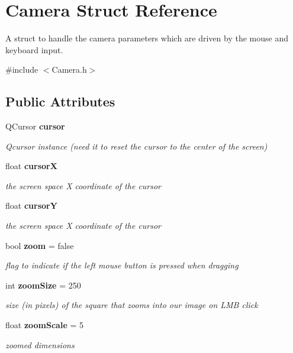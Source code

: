 \section{Camera Struct Reference}
\label{struct_camera}


A struct to handle the camera parameters which are driven by the mouse and keyboard input.  




{\ttfamily \#include $<$Camera.\+h$>$}

\subsection*{Public Attributes}
\begin{DoxyCompactItemize}
\item 
Q\+Cursor \textbf{ cursor}
\begin{DoxyCompactList}\small\item\em Qcursor instance (need it to reset the cursor to the center of the screen) \end{DoxyCompactList}\item 
float \textbf{ cursorX}
\begin{DoxyCompactList}\small\item\em the screen space X coordinate of the cursor \end{DoxyCompactList}\item 
float \textbf{ cursorY}
\begin{DoxyCompactList}\small\item\em the screen space X coordinate of the cursor \end{DoxyCompactList}\item 
bool \textbf{ zoom} = false
\begin{DoxyCompactList}\small\item\em flag to indicate if the left mouse button is pressed when dragging \end{DoxyCompactList}\item 
int \textbf{ zoom\+Size} = 250
\begin{DoxyCompactList}\small\item\em size (in pixels) of the square that zooms into our image on L\+MB click \end{DoxyCompactList}\item 
float \textbf{ zoom\+Scale} = 5
\begin{DoxyCompactList}\small\item\em zoomed dimensions \end{DoxyCompactList}\item 

\end{DoxyCompactItemize}
